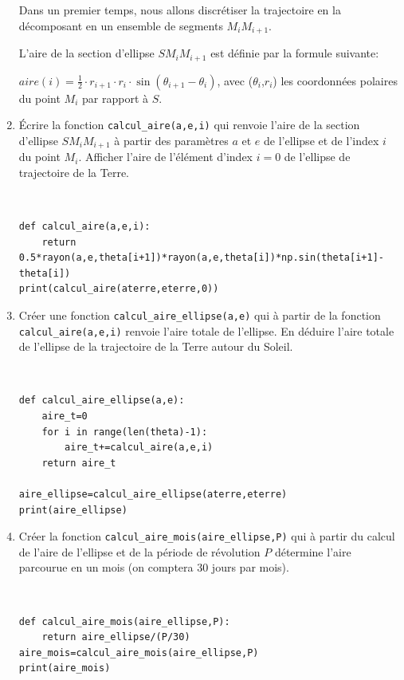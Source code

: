 \begin{enumerate}
Dans un premier temps, nous allons discrétiser la trajectoire en la décomposant en un ensemble de segments $M_iM_{i+1}$.

L'aire de la section d'ellipse $SM_iM_{i+1}$ est définie par la formule suivante:

$aire(i)=\frac{1}{2}\cdot r_{i+1}\cdot r_i\cdot \sin(\theta_{i+1}-\theta_i)$, avec ($\theta_i$,$r_i$) les coordonnées polaires du point $M_i$ par rapport à $S$.

\item Écrire la fonction \verb?calcul_aire(a,e,i)? qui renvoie l'aire de la section d'ellipse $SM_iM_{i+1}$ à partir des paramètres $a$ et $e$ de l'ellipse et de l'index $i$ du point $M_i$. Afficher l'aire de l'élément d'index $i=0$ de l'ellipse de trajectoire de la Terre.

\begin{solution}~\ \\
\begin{verbatim}
def calcul_aire(a,e,i):
    return 0.5*rayon(a,e,theta[i+1])*rayon(a,e,theta[i])*np.sin(theta[i+1]-theta[i])
print(calcul_aire(aterre,eterre,0))
\end{verbatim}
\end{solution}

\item Créer une fonction \verb?calcul_aire_ellipse(a,e)? qui à partir de la fonction \verb?calcul_aire(a,e,i)? renvoie l'aire totale de l'ellipse. En déduire l'aire totale de l'ellipse de la trajectoire de la Terre autour du Soleil.

\begin{solution}~\ \\
\begin{verbatim}
def calcul_aire_ellipse(a,e):
    aire_t=0
    for i in range(len(theta)-1):
        aire_t+=calcul_aire(a,e,i)
    return aire_t

aire_ellipse=calcul_aire_ellipse(aterre,eterre)
print(aire_ellipse)
\end{verbatim}
\end{solution}

\item Créer la fonction \verb?calcul_aire_mois(aire_ellipse,P)? qui à partir du calcul de l'aire de l'ellipse et de la période de révolution $P$ détermine l'aire parcourue en un mois (on comptera 30 jours par mois).

\begin{solution}~\ \\
\begin{verbatim}
def calcul_aire_mois(aire_ellipse,P):
    return aire_ellipse/(P/30)
aire_mois=calcul_aire_mois(aire_ellipse,P)
print(aire_mois)
\end{verbatim}
\end{solution}


\end{enumerate}
